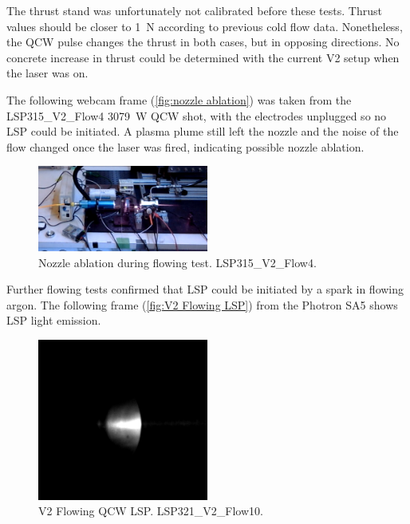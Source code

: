         The thrust stand was unfortunately not calibrated before these tests. Thrust values should be closer to \qty{1}{N} according to previous cold flow data. Nonetheless, the QCW pulse changes the thrust in both cases, but in opposing directions. No concrete increase in thrust could be determined with the current V2 setup when the laser was on.

        The following webcam frame (\autoref{fig:nozzle ablation}) was taken from the LSP315\_V2\_Flow4 \qty{3079}{W} QCW shot, with the electrodes unplugged so no LSP could be initiated. A plasma plume still left the nozzle and the noise of the flow changed once the laser was fired, indicating possible nozzle ablation.

        \begin{figure}[!ht]
            \centering
            \includegraphics[width=0.5\textwidth]{assets/5 discussion/Nozzle ablation.png}
            \caption{Nozzle ablation during flowing test. LSP315\_V2\_Flow4.}
            \label{fig:nozzle ablation}
        \end{figure}

        Further flowing tests confirmed that LSP could be initiated by a spark in flowing argon. The following frame (\autoref{fig:V2 Flowing LSP}) from the Photron SA5 shows LSP light emission.

        \begin{figure}[!ht]
            \centering
            \includegraphics[width=0.5\textwidth]{assets/4 experiments/LSP321_V2_FLOW10.png}
            \caption{V2 Flowing QCW LSP. LSP321\_V2\_Flow10.}
            \label{fig:V2 Flowing LSP}
        \end{figure}

        



